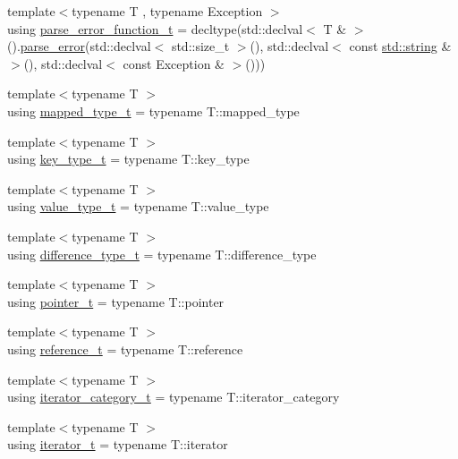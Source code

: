 \begin{DoxyCompactItemize}
\item 
{\footnotesize template$<$typename T , typename Exception $>$ }\\using \hyperlink{namespacenlohmann_1_1detail_a264d4d58bc1fd82bcc7bf6bf73d6acad}{parse\+\_\+error\+\_\+function\+\_\+t} = decltype(std\+::declval$<$ T \& $>$().\hyperlink{classnlohmann_1_1detail_1_1parse__error}{parse\+\_\+error}(std\+::declval$<$ std\+::size\+\_\+t $>$(), std\+::declval$<$ const \hyperlink{namespacenlohmann_1_1detail_a1ed8fc6239da25abcaf681d30ace4985ab45cffe084dd3d20d928bee85e7b0f21}{std\+::string} \& $>$(), std\+::declval$<$ const Exception \& $>$()))
\item 
{\footnotesize template$<$typename T $>$ }\\using \hyperlink{namespacenlohmann_1_1detail_a9c1795c148875722f8482d39e0eb9364}{mapped\+\_\+type\+\_\+t} = typename T\+::mapped\+\_\+type
\item 
{\footnotesize template$<$typename T $>$ }\\using \hyperlink{namespacenlohmann_1_1detail_a66dfe39f03b05d6b7265a0ff748d64ef}{key\+\_\+type\+\_\+t} = typename T\+::key\+\_\+type
\item 
{\footnotesize template$<$typename T $>$ }\\using \hyperlink{namespacenlohmann_1_1detail_af91beae90c2fb0f931079b3d50a343bc}{value\+\_\+type\+\_\+t} = typename T\+::value\+\_\+type
\item 
{\footnotesize template$<$typename T $>$ }\\using \hyperlink{namespacenlohmann_1_1detail_a3603b59a17d1c5e15050743b847992f2}{difference\+\_\+type\+\_\+t} = typename T\+::difference\+\_\+type
\item 
{\footnotesize template$<$typename T $>$ }\\using \hyperlink{namespacenlohmann_1_1detail_a26dc71e2dd9336587e56062178f9abce}{pointer\+\_\+t} = typename T\+::pointer
\item 
{\footnotesize template$<$typename T $>$ }\\using \hyperlink{namespacenlohmann_1_1detail_a082bdafd3b4c61d9d1e92b35b8f75ee3}{reference\+\_\+t} = typename T\+::reference
\item 
{\footnotesize template$<$typename T $>$ }\\using \hyperlink{namespacenlohmann_1_1detail_ad22d2aa3aab018050ae519f6754366e1}{iterator\+\_\+category\+\_\+t} = typename T\+::iterator\+\_\+category
\item 
{\footnotesize template$<$typename T $>$ }\\using \hyperlink{namespacenlohmann_1_1detail_a9ff93db146174305bce1bc4c54703e11}{iterator\+\_\+t} = typename T\+::iterator

\end{DoxyCompactItemize}
